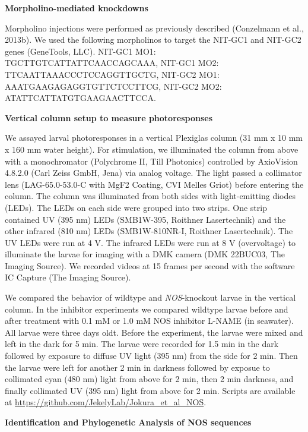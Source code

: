 \documentclass[
  10pt,
  onecolumn]{article}
\begin{document}
\textbf{Morpholino-mediated knockdowns}

Morpholino injections were performed as previously described (Conzelmann
et al., 2013b). We used the following morpholinos to target the NIT-GC1
and NIT-GC2 genes (GeneTools, LLC). NIT-GC1 MO1:
TGCTTGTCATTATTCAACCAGCAAA, NIT-GC1 MO2: TTCAATTAAACCCTCCAGGTTGCTG,
NIT-GC2 MO1: AAATGAAGAGAGGTGTTCTCCTTCG, NIT-GC2 MO2:
ATATTCATTATGTGAAGAACTTCCA.

\textbf{Vertical column setup to measure photoresponses}

We assayed larval photoresponses in a vertical Plexiglas column (31 mm x
10 mm x 160 mm water height). For stimulation, we illuminated the column
from above with a monochromator (Polychrome II, Till Photonics)
controlled by AxioVision 4.8.2.0 (Carl Zeiss GmbH, Jena) via analog
voltage. The light passed a collimator lens (LAG-65.0-53.0-C with MgF2
Coating, CVI Melles Griot) before entering the column. The column was
illuminated from both sides with light-emitting diodes (LEDs). The LEDs
on each side were grouped into two strips. One strip contained UV (395
nm) LEDs (SMB1W-395, Roithner Lasertechnik) and the other infrared (810
nm) LEDs (SMB1W-810NR-I, Roithner Lasertechnik). The UV LEDs were run at
4 V. The infrared LEDs were run at 8 V (overvoltage) to illuminate the
larvae for imaging with a DMK camera (DMK 22BUC03, The Imaging Source).
We recorded videos at 15 frames per second with the software IC Capture
(The Imaging Source).

We compared the behavior of wildtype and \emph{NOS}-knockout larvae in
the vertical column. In the inhibitor experiments we compared wildtype
larvae before and after treatment with 0.1 mM or 1.0 mM NOS inhibitor
L-NAME (in seawater). All larvae were three days oldt. Before the
experiment, the larvae were mixed and left in the dark for 5 min. The
larvae were recorded for 1.5 min in the dark followed by exposure to
diffuse UV light (395 nm) from the side for 2 min. Then the larvae were
left for another 2 min in darkness followed by exposue to collimated
cyan (480 nm) light from above for 2 min, then 2 min darkness, and
finally collimated UV (395 nm) light from above for 2 min. Scripts are
available at \url{https://github.com/JekelyLab/Jokura_et_al_NOS}.

\textbf{Identification and Phylogenetic Analysis of NOS sequences}
\end{document}

